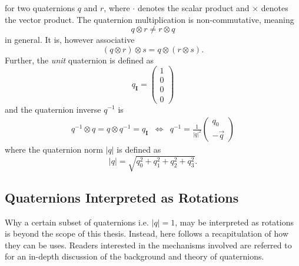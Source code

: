 \documentclass{LTHthesis}
\begin{document}
%
for two quaternions $q$ and $r$, where $\cdot$ denotes the scalar product and $\times$ denotes the vector product. The quaternion multiplication is non-commutative, meaning
%
\begin{equation}
{q}\otimes {r} \neq {r} \otimes {q}
\end{equation}
%
in general. It is, however associative
%
\begin{equation}
({q}\otimes{r})\otimes{s} = {q}\otimes({r}\otimes{s}).
\label{equation:quat_asso}
\end{equation} 
%
Further, the \emph{unit} quaternion is defined as
%
\begin{equation}
{q_{\mathbf{I}}}=\left(\begin{array}{c}1\\ 0 \\ 0 \\ 0\end{array}\right)
\end{equation}
%
and the quaternion inverse $q^{-1}$ is
%
\begin{eqnarray}
q^{-1}\otimes q = q\otimes q^{-1} = q_{\mathbf{I}} &\Leftrightarrow& q^{-1} = \frac{1}{|q|^2}\left(\begin{array}{c}q_0\\ -\vec{q}\end{array}\right)
\end{eqnarray}
%
where the quaternion norm $|q|$ is defined as
%
\begin{equation}
|q| = \sqrt{q_0^2+q_1^2+q_2^2+q_3^2 }.
\end{equation} 
%
\subsection{Quaternions Interpreted as Rotations}
%
Why a certain subset of quaternions i.e. $|q|=1$, may be interpreted as rotations is beyond the scope of this thesis. Instead, here follows a recapitulation of how they can be uses. Readers interested in the mechanisms involved are referred to \cite{kuip98} for an in-depth discussion of the background and theory of quaternions. 
\end{document}
